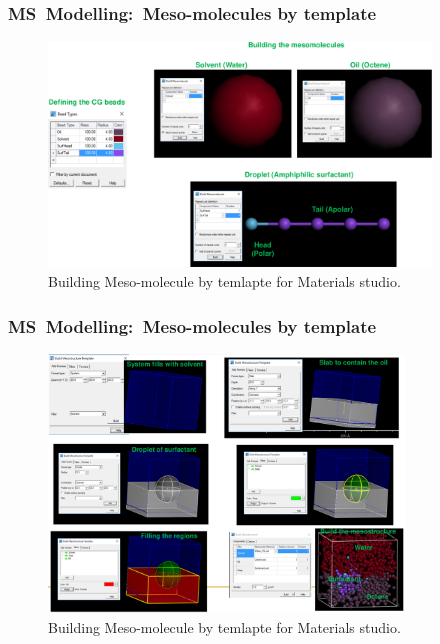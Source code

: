 \frame
{
	\frametitle{\textrm{MS~Modelling:~Meso-molecules by template}}
\begin{figure}[h!]
\centering
\vspace*{-0.12in}
\includegraphics[height=2.36in,width=4.00in,viewport=0 0 1224 720,clip]{Figures/MS-Building_Mesomolecule-template.png}
\caption{\tiny \textrm{Building Meso-molecule by temlapte for Materials studio.}}%
\label{MS-Building_Meso-molecules-template}
\end{figure}
}

\frame
{
	\frametitle{\textrm{MS~Modelling:~Meso-molecules by template}}
\begin{figure}[h!]
\centering
\vspace*{-0.18in}
\includegraphics[height=2.70in,width=3.72in,viewport=0 0 1133 822,clip]{Figures/MS-Building_Mesomolecule-example.png}
\caption{\tiny \textrm{Building Meso-molecule by temlapte for Materials studio.}}%
\label{MS-Building_Meso-molecules-template-example}
\end{figure}
}

